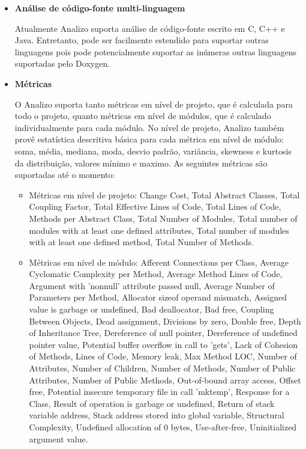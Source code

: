 \begin{itemize}

\item {\bf Análise de código-fonte multi-linguagem}

Atualmente Analizo suporta análise de código-fonte escrito em C, C++ e Java.
Entretanto, pode ser facilmente estendido para suportar outras linguagens pois
pode potencialmente suportar as inúmeras outras linguagens suportadas pelo Doxygen.

\item {\bf Métricas}\label{metricas}

O Analizo suporta tanto métricas em nível de projeto, que é calculada para todo o projeto,
quanto métricas em nível de módulos, que é calculado individualmente para cada módulo.
No nível de projeto, Analizo também provê estatística descritiva básica para cada métrica em
nível de módulo: soma, média, mediana, moda, desvio padrão, variância, skewness e kurtosis da
distribuição, valores mínimo e maximo. As seguintes métricas são suportadas até o momento:

\begin{itemize}

  \item Métricas em nível de projeto: Change Cost, Total Abstract Classes,
  Total Coupling Factor, Total Effective Lines of Code, Total Lines of Code,
  Methods per Abstract Class, Total Number of Modules, Total number of modules
  with at least one defined attributes, Total number of modules with at least
  one defined method, Total Number of Methods.

  \item Métricas em nível de módulo: Afferent Connections per Class, Average
  Cyclomatic Complexity per Method, Average Method Lines of Code, Argument with
  'nonnull' attribute passed null, Average Number of Parameters per Method,
  Allocator sizeof operand mismatch, Assigned value is garbage or undefined,
  Bad deallocator, Bad free, Coupling Between Objects, Dead assignment,
  Divisions by zero, Double free, Depth of Inheritance Tree, Dereference of
 null pointer, Dereference of undefined pointer value, Potential buffer
  overflow in call to 'gets', Lack of Cohesion of Methods, Lines of Code,
  Memory leak, Max Method LOC, Number of Attributes, Number of Children, Number
  of Methods, Number of Public Attributes, Number of Public Methods,
  Out-of-bound array access, Offset free, Potential insecure temporary file in
  call 'mktemp', Response for a Class, Result of operation is garbage or
  undefined, Return of stack variable address, Stack address stored into global
  variable, Structural Complexity, Undefined allocation of 0 bytes,
  Use-after-free, Uninitialized argument value.


\end{itemize}
\end{itemize}
